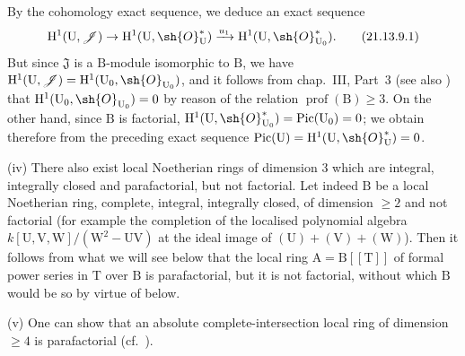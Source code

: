 \begin{env}[21.13.9]
By the cohomology exact sequence, we deduce an exact sequence
\[
\label{IV.21.13.9.1}
  \mathrm{H}^1(\mathrm{U},\mathscr{J})\to\mathrm{H}^1(\mathrm{U},\sh{O}_{\mathrm{U}}^*)\xrightarrow{u_1}\mathrm{H}^1(\mathrm{U},\sh{O}_{\mathrm{U}_0}^*).
  \tag{21.13.9.1}
\]
But since $\mathfrak{J}$ is a $\mathrm{B}$-module isomorphic to $\mathrm{B}$, we have $\mathrm{H}^1(\mathrm{U},\mathscr{J})=\mathrm{H}^1(\mathrm{U}_0,\sh{O}_{\mathrm{U}_0})$, and it follows from chap.~III, Part~3 (see also \cite[III, Example~III-1]{IV-41}) that
$\mathrm{H}^1(\mathrm{U}_0,\sh{O}_{\mathrm{U}_0})=0$ by reason of the relation $\operatorname{prof}(\mathrm{B})\geq 3$.
On the other hand, since $\mathrm{B}$ is factorial, $\mathrm{H}^1(\mathrm{U},\sh{O}_{\mathrm{U}_0}^*)=\operatorname{Pic}(\mathrm{U}_0)=0$; we obtain therefore from the preceding exact sequence $\operatorname{Pic}(\mathrm{U})=\mathrm{H}^1(\mathrm{U},\sh{O}_{\mathrm{U}}^*)=0$.

(iv) There also exist local Noetherian rings of dimension $3$ which are integral, integrally closed and parafactorial, but not factorial.
Let indeed $\mathrm{B}$ be a local Noetherian ring, complete, integral, integrally closed, of dimension $\geq 2$ and not factorial (for example the completion of the localised polynomial algebra $k[\mathrm{U},\mathrm{V},\mathrm{W}]/(\mathrm{W}^2-\mathrm{U}\mathrm{V})$ at the ideal image of $(\mathrm{U})+(\mathrm{V})+(\mathrm{W})$).
Then it follows from what we will see below  that the local ring $\mathrm{A}=\mathrm{B}[[\mathrm{T}]]$ of formal power series in $\mathrm{T}$ over $\mathrm{B}$ is parafactorial, but it is not factorial, without which $\mathrm{B}$ would be so by virtue of  below.

(v) One can show that an absolute complete-intersection local ring  of dimension $\geq 4$ is parafactorial (cf.\ \cite[XI, $3.13$~(i)]{IV-41}).


\end{env}
